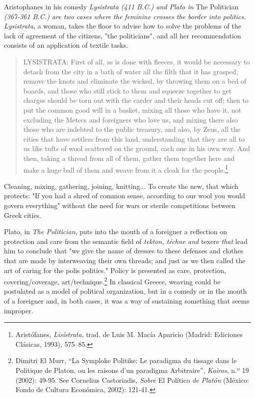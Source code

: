 \documentclass{tufte-handout}
\begin{document}
Aristophanes in his comedy \emph{Lysistrata (411 B.C.) and Plato in} The
Politician \emph{(367-361 B.C.) are two cases where the feminine crosses
the border into politics.} \emph{Lysistrata}, a woman, takes the floor
to advise how to solve the problems of the lack of agreement of the
citizens, "the politicians", and all her recommendation consists of an
application of textile tasks.

\begin{quote}
LYSISTRATA: First of all, as is done with fleeces, it would be necessary
to detach from the city in a bath of water all the filth that it has
grasped, remove the knots and eliminate the wicked, by throwing them on
a bed of boards, and those who still stick to them and squeeze together
to get charges should be torn out with the carder and their heads cut
off; then to put the common good will in a basket, mixing all those who
have it, not excluding the Metecs and foreigners who love us, and mixing
there also those who are indebted to the public treasury, and also, by
Zeus, all the cities that have settlers from this land, understanding
that they are all to us like tufts of wool scattered on the ground, each
one in his own way. And then, taking a thread from all of them, gather
them together here and make a huge ball of them and weave from it a
cloak for the people.\footnote{Aristófanes, \emph{Lisístrata}, trad. de
  Luis M. Macía Aparicio (Madrid: Ediciones Clásicas, 1993), 575--85.}
\end{quote}

\enlargethispage{\baselineskip}

\noindent Cleaning, mixing, gathering, joining, knitting... To create the new,
that which protects: "If you had a shred of common sense, according to
our wool you would govern everything" without the need for wars or
sterile competitions between Greek cities.

Plato, in \emph{The Politician}, puts into the mouth of a foreigner a
reflection on protection and care from the semantic field of
\emph{tekton, téchne and} texere \emph{that} lead him to conclude that
"we give the name of dresses to these defenses and clothes that are made
by interweaving their own threads; and just as we then called the art of
caring for the \textquotesingle polis\textquotesingle{}
\textquotesingle politics.\textquotesingle" Policy is presented as care,
protection, covering/coverage, art/technique.\footnote{Dimitri El Murr,
  ``La Symploke Politike: Le paradigma du tissage dans le Politique de
  Platon, ou les raisons d'un paradigma Arbitraire'', \emph{Kairos}, n.º
  19 (2002): 49-95. See Cornelius Castoriadis, \emph{Sobre} El Político
  \emph{de Platón} (México: Fondo de Cultura Económica, 2002): 121-41.}
In classical Greece, weaving could be postulated as a model of political
organization, but in a comedy or in the mouth of a foreigner and, in
both cases, it was a way of sustaining something that seems improper.
\end{document}
